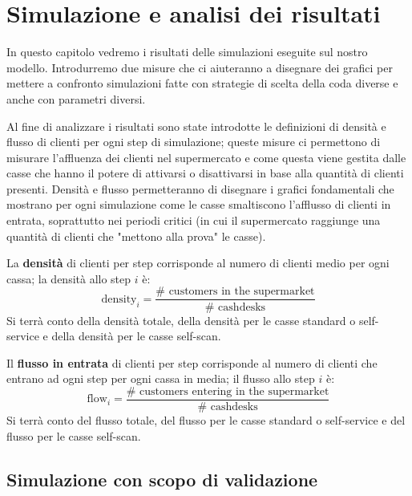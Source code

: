 \chapter{Simulazione e analisi dei risultati}
\label{chapter:simulation}

In questo capitolo vedremo i risultati delle simulazioni eseguite sul nostro modello. Introdurremo due misure che ci aiuteranno a disegnare dei grafici per mettere a confronto simulazioni fatte con strategie di scelta della coda diverse e anche con parametri diversi.

\vspace*{1\baselineskip}

Al fine di analizzare i risultati sono state introdotte le definizioni di densità e flusso di clienti per ogni step di simulazione; queste misure ci permettono di misurare l'affluenza dei clienti nel supermercato e come questa viene gestita dalle casse che hanno il potere di attivarsi o disattivarsi in base alla quantità di clienti presenti. Densità e flusso permetteranno di disegnare i grafici fondamentali che mostrano per ogni simulazione come le casse smaltiscono l'afflusso di clienti in entrata, soprattutto nei periodi critici (in cui il supermercato raggiunge una quantità di clienti che "mettono alla prova" le casse).

La \textbf{densità} di clienti per step corrisponde al numero di clienti medio per ogni cassa; la densità allo step $i$ è:
\begin{equation}
	\text{density}_i = \frac{\# \text{ customers in the supermarket}}{\# \text{ cashdesks}}
\end{equation}
Si terrà conto della densità totale, della densità per le casse standard o self-service e della densità per le casse self-scan.


Il \textbf{flusso in entrata} di clienti per step corrisponde al numero di clienti che entrano ad ogni step per ogni cassa in media; il flusso allo step $i$ è:
\begin{equation}
	\text{flow}_i = \frac{\# \text{ customers entering in the supermarket}}{\# \text{ cashdesks}}
\end{equation}
Si terrà conto del flusso totale, del flusso per le casse standard o self-service e del flusso per le casse self-scan.

\section{Simulazione con scopo di validazione}

